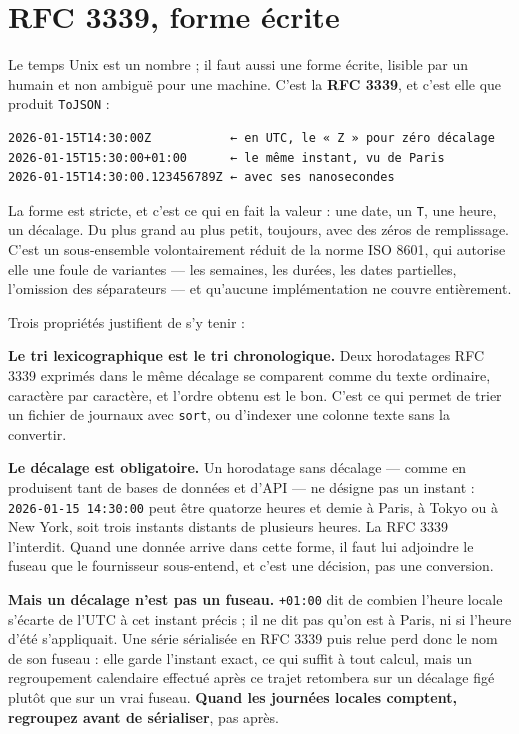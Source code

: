 \documentclass[11pt,a4paper]{report}
\begin{document}
\section{RFC 3339, forme écrite}\label{sec:rfc}

Le temps Unix est un nombre ; il faut aussi une forme écrite, lisible
par un humain et non ambiguë pour une machine. C'est la \textbf{RFC
3339}, et c'est elle que produit \texttt{ToJSON} :

\begin{verbatim}
2026-01-15T14:30:00Z           ← en UTC, le « Z » pour zéro décalage
2026-01-15T15:30:00+01:00      ← le même instant, vu de Paris
2026-01-15T14:30:00.123456789Z ← avec ses nanosecondes
\end{verbatim}

La forme est stricte, et c'est ce qui en fait la valeur : une date, un
\texttt{T}, une heure, un décalage. Du plus grand au plus petit,
toujours, avec des zéros de remplissage. C'est un sous-ensemble
volontairement réduit de la norme ISO 8601, qui autorise elle une foule
de variantes --- les semaines, les durées, les dates partielles,
l'omission des séparateurs --- et qu'aucune implémentation ne couvre
entièrement.

Trois propriétés justifient de s'y tenir :

\textbf{Le tri lexicographique est le tri chronologique.} Deux
horodatages RFC 3339 exprimés dans le même décalage se comparent comme
du texte ordinaire, caractère par caractère, et l'ordre obtenu est le
bon. C'est ce qui permet de trier un fichier de journaux avec
\texttt{sort}, ou d'indexer une colonne texte sans la convertir.

\textbf{Le décalage est obligatoire.} Un horodatage sans décalage ---
comme en produisent tant de bases de données et d'API --- ne désigne pas
un instant : \texttt{2026-01-15\ 14:30:00} peut être quatorze heures et
demie à Paris, à Tokyo ou à New York, soit trois instants distants de
plusieurs heures. La RFC 3339~\cite{rfc3339} l'interdit. Quand une donnée arrive dans
cette forme, il faut lui adjoindre le fuseau que le fournisseur
sous-entend, et c'est une décision, pas une conversion.

\textbf{Mais un décalage n'est pas un fuseau.} \texttt{+01:00} dit de
combien l'heure locale s'écarte de l'UTC à cet instant précis ; il ne
dit pas qu'on est à Paris, ni si l'heure d'été s'appliquait. Une série
sérialisée en RFC 3339 puis relue perd donc le nom de son fuseau : elle
garde l'instant exact, ce qui suffit à tout calcul, mais un regroupement
calendaire effectué après ce trajet retombera sur un décalage figé
plutôt que sur un vrai fuseau. \textbf{Quand les journées locales
comptent, regroupez avant de sérialiser}, pas après.
\end{document}
